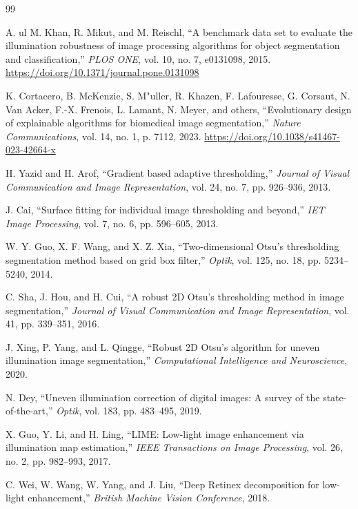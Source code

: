 \documentclass[11pt,a4paper]{article}
\begin{document}
\begin{thebibliography}{99}

A. ul M. Khan, R. Mikut, and M. Reischl,
``A benchmark data set to evaluate the illumination robustness of image processing algorithms for object segmentation and classification,''
\emph{PLOS ONE}, vol. 10, no. 7, e0131098, 2015.
\url{https://doi.org/10.1371/journal.pone.0131098}

K. Cortacero, B. McKenzie, S. M{"u}ller, R. Khazen, F. Lafouresse, G. Corsaut, N. Van Acker, F.-X. Frenois, L. Lamant, N. Meyer, and others,
``Evolutionary design of explainable algorithms for biomedical image segmentation,''
\emph{Nature Communications}, vol. 14, no. 1, p. 7112, 2023.
\url{https://doi.org/10.1038/s41467-023-42664-x}

H. Yazid and H. Arof,
``Gradient based adaptive thresholding,''
\emph{Journal of Visual Communication and Image Representation}, vol. 24, no. 7, pp. 926--936, 2013.

J. Cai,
``Surface fitting for individual image thresholding and beyond,''
\emph{IET Image Processing}, vol. 7, no. 6, pp. 596--605, 2013.

W. Y. Guo, X. F. Wang, and X. Z. Xia,
``Two-dimensional Otsu's thresholding segmentation method based on grid box filter,''
\emph{Optik}, vol. 125, no. 18, pp. 5234--5240, 2014.

C. Sha, J. Hou, and H. Cui,
``A robust 2D Otsu's thresholding method in image segmentation,''
\emph{Journal of Visual Communication and Image Representation}, vol. 41, pp. 339--351, 2016.

J. Xing, P. Yang, and L. Qingge,
``Robust 2D Otsu's algorithm for uneven illumination image segmentation,''
\emph{Computational Intelligence and Neuroscience}, 2020.

N. Dey,
``Uneven illumination correction of digital images: A survey of the state-of-the-art,''
\emph{Optik}, vol. 183, pp. 483--495, 2019.

X. Guo, Y. Li, and H. Ling,
``LIME: Low-light image enhancement via illumination map estimation,''
\emph{IEEE Transactions on Image Processing}, vol. 26, no. 2, pp. 982--993, 2017.

C. Wei, W. Wang, W. Yang, and J. Liu,
``Deep Retinex decomposition for low-light enhancement,''
\emph{British Machine Vision Conference}, 2018.


\end{thebibliography}
\end{document}
